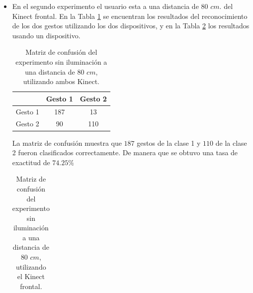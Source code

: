 \begin{itemize}
La matriz de confusión muestra que $154$ gestos de la clase 1 y $133$ de la clase 2 fueron clasificados correctamente. De manera que se obtuvo una tasa de exactitud de $46.75 \%$ 


\item En el segundo experimento el usuario esta a una distancia de $80$ $cm.$ del Kinect frontal. En la Tabla \ref{table:80LnoK2} se encuentran los resultados del reconocimiento de los dos gestos utilizando los dos dispositivos, y en la Tabla \ref{table:80LnoK1} los resultados usando un dispositivo.   


\begin{table}[h!] 
\begin{center} 
\caption{Matriz de confusión del experimento sin iluminación a una distancia de $80$ $cm$, utilizando ambos Kinect.}
\label{table:80LnoK2}
\begin{tabular}{ r || c | c |} 
 
        & Gesto 1 & Gesto 2 \\ \hline \hline  
Gesto 1 & 187     &  13     \\ \hline  
Gesto 2 & 90     &  110     \\   

\end{tabular}
\end{center} 
\end{table}  

La matriz de confusión muestra que $187$ gestos de la clase 1 y $110$ de la clase 2 fueron clasificados correctamente. De manera que se obtuvo una tasa de exactitud de $74.25 \%$ 

\begin{table}[h!] 
\begin{center} 
\caption{Matriz de confusión del experimento sin iluminación a una distancia de $80$ $cm$, utilizando el Kinect frontal.}
\label{table:80LnoK1}
\begin{tabular}{ r || c | c |} 
 

\end{tabular}
\end{center}
\end{table}
\end{itemize}
